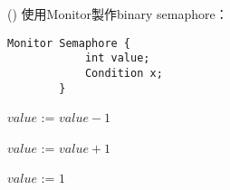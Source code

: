 \begin{theorem}{()} 使用Monitor製作binary semaphore：
    \begin{lstlisting}[caption={Data structure (Making semaphore using monitor).}, captionpos=b, mathescape=true]
        Monitor Semaphore {
            int value;
            Condition x;
        }
    \end{lstlisting}
    \begin{algorithm}[H]
        \caption{$Wait$.}
        \begin{algorithmic}[1]
                    \State {}
                \EndIf
                \State $value$ := $value - 1$
            \EndFunction
        \end{algorithmic}
    \end{algorithm}
    \begin{algorithm}[H]
        \caption{$Signal$.}
        \begin{algorithmic}[1]
                \State $value$ := $value + 1$
                \State {}
            \EndFunction
        \end{algorithmic}
    \end{algorithm}
    \begin{algorithm}[H]
        \caption{$initialization\_code()$.}
        \begin{algorithmic}[1]
                \State $value$ := $1$
            \EndFunction
        \end{algorithmic}
    \end{algorithm}
\end{theorem}

